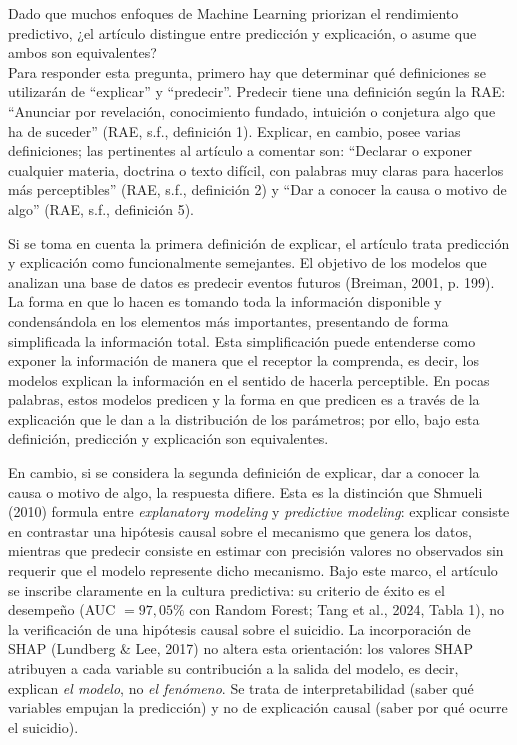 \documentclass[11pt]{article}
\begin{document}
 Dado que muchos enfoques de Machine Learning priorizan el rendimiento predictivo, ¿el artículo distingue entre predicción y explicación, o asume que ambos son equivalentes?
\\

Para responder esta pregunta, primero hay que determinar qué definiciones se utilizarán de ``explicar'' y ``predecir''. Predecir tiene una definición según la RAE: ``Anunciar por revelación, conocimiento fundado, intuición o conjetura algo que ha de suceder'' (RAE, s.f., definición 1). Explicar, en cambio, posee varias definiciones; las pertinentes al artículo a comentar son: ``Declarar o exponer cualquier materia, doctrina o texto difícil, con palabras muy claras para hacerlos más perceptibles'' (RAE, s.f., definición 2) y ``Dar a conocer la causa o motivo de algo'' (RAE, s.f., definición 5).

Si se toma en cuenta la primera definición de explicar, el artículo trata predicción y explicación como funcionalmente semejantes. El objetivo de los modelos que analizan una base de datos es predecir eventos futuros (Breiman, 2001, p. 199). La forma en que lo hacen es tomando toda la información disponible y condensándola en los elementos más importantes, presentando de forma simplificada la información total. Esta simplificación puede entenderse como exponer la información de manera que el receptor la comprenda, es decir, los modelos explican la información en el sentido de hacerla perceptible. En pocas palabras, estos modelos predicen y la forma en que predicen es a través de la explicación que le dan a la distribución de los parámetros; por ello, bajo esta definición, predicción y explicación son equivalentes.

En cambio, si se considera la segunda definición de explicar, dar a conocer la causa o motivo de algo, la respuesta difiere. Esta es la distinción que Shmueli (2010) formula entre \textit{explanatory modeling} y \textit{predictive modeling}: explicar consiste en contrastar una hipótesis causal sobre el mecanismo que genera los datos, mientras que predecir consiste en estimar con precisión valores no observados sin requerir que el modelo represente dicho mecanismo. Bajo este marco, el artículo se inscribe claramente en la cultura predictiva: su criterio de éxito es el desempeño (AUC $= 97{,}05\%$ con Random Forest; Tang et al., 2024, Tabla 1), no la verificación de una hipótesis causal sobre el suicidio. La incorporación de SHAP (Lundberg \& Lee, 2017) no altera esta orientación: los valores SHAP atribuyen a cada variable su contribución a la salida del modelo, es decir, explican \textit{el modelo}, no \textit{el fenómeno}. Se trata de interpretabilidad (saber qué variables empujan la predicción) y no de explicación causal (saber por qué ocurre el suicidio).
\end{document}
